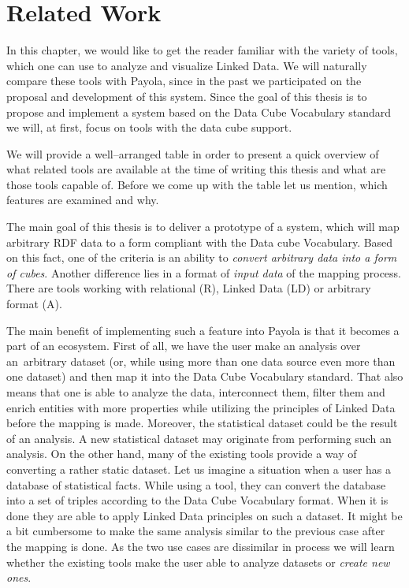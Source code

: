 \chapter{Related Work}
\label{chap:rw}

In this chapter, we would like to get the reader familiar with the variety of tools, which one can
use to analyze and visualize Linked Data. We will naturally compare these tools with
Payola, since in the past we participated on the proposal and development of this system.
Since the goal of this thesis is to propose and implement a system based on the Data Cube Vocabulary
standard we will, at first, focus on tools with the data cube support. 

We will provide a well--arranged table in order to present a quick overview of
what related tools are available at the time of writing this thesis and what are those 
tools capable of. Before we come up with the table let us mention, which
features are examined and why.

The main goal of this thesis is to deliver a prototype of a system, which will map 
arbitrary RDF data to a form compliant with the Data cube Vocabulary. Based on 
this fact, one of the criteria is an ability to \emph{convert arbitrary data 
into a form of cubes}. Another difference lies in a format of \emph{input data} of the
mapping process. There are tools working with relational (R), Linked Data (LD) or
arbitrary format (A).

The main benefit of implementing such a feature into Payola is that it becomes a 
part of an ecosystem. First of all, we have the user make an analysis over an~arbitrary
dataset (or, while using more than one data source even more than one dataset)
and then map it into the Data Cube Vocabulary standard. That also means that one is able
to analyze the data, interconnect them, filter them and enrich entities with more properties
while utilizing the principles of Linked Data before the mapping is made. Moreover, the statistical
dataset could be the result of an analysis. A new statistical dataset may originate from performing
such an analysis. On the other hand, many of the existing 
tools provide a way of converting a rather static dataset. Let us imagine a situation when a 
user has a database of statistical facts. While using a tool, they can 
convert the database into a set of triples according to the Data Cube 
Vocabulary format. When it is done they are able to apply Linked Data principles
on such a dataset. It might be a bit cumbersome to make the same analysis similar to
the previous case after the mapping is done. As the two use cases are dissimilar in process 
we will learn whether the existing tools make the user able to analyze datasets or \emph{create new ones}.

